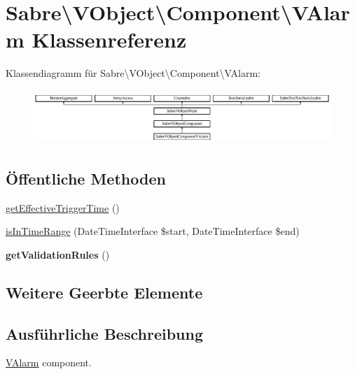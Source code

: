 \hypertarget{class_sabre_1_1_v_object_1_1_component_1_1_v_alarm}{}\section{Sabre\textbackslash{}V\+Object\textbackslash{}Component\textbackslash{}V\+Alarm Klassenreferenz}
\label{class_sabre_1_1_v_object_1_1_component_1_1_v_alarm}
Klassendiagramm für Sabre\textbackslash{}V\+Object\textbackslash{}Component\textbackslash{}V\+Alarm\+:\begin{figure}[H]
\begin{center}
\leavevmode
\includegraphics[height=2.064516cm]{class_sabre_1_1_v_object_1_1_component_1_1_v_alarm}
\end{center}
\end{figure}
\subsection*{Öffentliche Methoden}
\begin{DoxyCompactItemize}
\item 
\mbox{\hyperlink{class_sabre_1_1_v_object_1_1_component_1_1_v_alarm_a58b73ccd3fff7b8d102482b021581675}{get\+Effective\+Trigger\+Time}} ()
\item 
\mbox{\hyperlink{class_sabre_1_1_v_object_1_1_component_1_1_v_alarm_ac5e93f3242fe0cb4d6fa1f66423061c4}{is\+In\+Time\+Range}} (Date\+Time\+Interface \$start, Date\+Time\+Interface \$end)
\item 
\mbox{\label{class_sabre_1_1_v_object_1_1_component_1_1_v_alarm_a4e19f2f42b3cb72382994ea22ab98c3a}} 
{\bfseries get\+Validation\+Rules} ()
\end{DoxyCompactItemize}
\subsection*{Weitere Geerbte Elemente}


\subsection{Ausführliche Beschreibung}
\mbox{\hyperlink{class_sabre_1_1_v_object_1_1_component_1_1_v_alarm}{V\+Alarm}} component.

